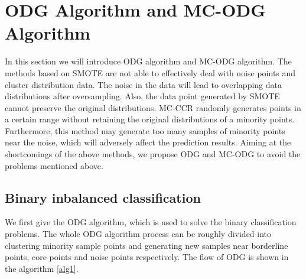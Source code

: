 \documentclass[runningheads]{llncs}
\begin{document}
\section{ODG Algorithm and MC-ODG Algorithm}
In this section we will introduce ODG algorithm and MC-ODG algorithm.
The methods based on SMOTE are not able to effectively deal with noise points and cluster distribution data.
The noise in the data will lead to overlapping data distributions after oversampling.
Also, the data point generated by SMOTE cannot preserve the original distributions.
MC-CCR randomly generates points in 
a certain range without retaining the original distributions of a minority points.
Furthermore, this method may generate too many samples of 
minority points near the noise, which will adversely affect the prediction results.
Aiming at the shortcomings of the above methods, 
we propose ODG and MC-ODG to avoid the problems mentioned above.

\subsection{Binary inbalanced classification}
We first give the ODG algorithm, which is used to solve the binary classification problems.
The whole ODG algorithm process can be roughly divided into clustering 
minority sample points and generating new samples near borderline points, core points and noise points respectively.
The flow of ODG is shown in the algorithm \ref{alg1}.
\end{document}
